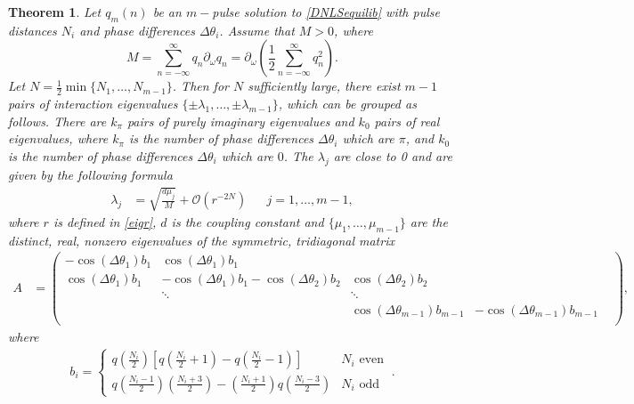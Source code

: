 \documentclass[12pt]{elsarticle}
\newtheorem{theorem}{Theorem}
\begin{document}
\begin{theorem}\label{DNLSeigtheorem}
Let $q_m(n)$ be an $m-$pulse solution to \cref{DNLSequilib} with pulse distances $N_i$ and phase differences $\Delta\theta_i$. Assume that $M > 0$, where
\[
M = \sum_{n=-\infty}^\infty q_n \partial_\omega q_n = \partial_\omega \left( \frac{1}{2} \sum_{n=-\infty}^\infty q_n^2 \right).
\]
Let $N = \frac{1}{2} \min\{ N_1, \dots, N_{m-1}\}$. Then for $N$ sufficiently large, there exist $m-1$ pairs of interaction eigenvalues $\{\pm \lambda_1, \dots, \pm \lambda_{m-1}\}$, which can be grouped as follows. There are $k_\pi$ pairs of purely imaginary eigenvalues and $k_0$ pairs of real eigenvalues, where $k_\pi$ is the number of phase differences $\Delta\theta_i$ which are $\pi$, and $k_0$ is the number of phase differences $\Delta\theta_i$ which are $0$. The $\lambda_j$ are close to 0 and are given by the following formula
\begin{align}\label{eigsDNLS}
\lambda_j &= \sqrt{\frac{d \mu_j}{M}} + \mathcal{O}(r^{-2N}) && j = 1, \dots, m-1,
\end{align}
where $r$ is defined in \cref{eigr}, $d$ is the coupling
constant and $\{ \mu_1, \dots, \mu_{m-1} \}$ are the distinct, real, nonzero eigenvalues of the symmetric, tridiagonal matrix
\begin{align}\label{DNLSmatrixA}
A &= \begin{pmatrix}
-\cos(\Delta\theta_1) b_1 & \cos(\Delta\theta_1) b_1 & & &  \\
\cos(\Delta\theta_1) b_1 & -\cos(\Delta\theta_1) b_1 - \cos(\Delta\theta_2) b_2 & \cos(\Delta\theta_2) b_2 \\
& \ddots & \ddots \\
& &  \cos(\Delta\theta_{m-1}) b_{m-1} & -\cos(\Delta\theta_{m-1}) b_{m-1}  \\
\end{pmatrix},
\end{align}
where
\begin{align}\label{bieq}
b_i = \begin{cases}
q\left(\frac{N_i}{2}\right) \left[ q\left(\frac{N_i}{2} + 1\right) - q\left(\frac{N_i}{2} - 1\right) \right] & N_i \text{ even} \\
q\left(\frac{N_i-1}{2}\right)\left(\frac{N_i+3}{2}\right) 
- \left(\frac{N_i+1}{2}\right)q\left(\frac{N_i-3}{2}\right) & N_i \text{ odd}
\end{cases} \:.
\end{align}
\end{theorem}
\end{document}

